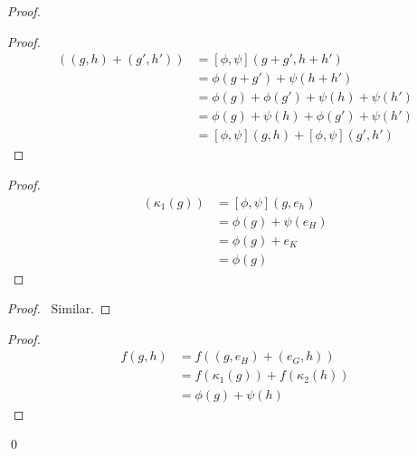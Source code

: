 \begin{proof}
    \pf
    \begin{proof}
        \pf
        \begin{align*}
            [\phi,\psi]((g,h) + (g',h')) & = [\phi,\psi](g + g', h + h')             \\
                                         & = \phi(g + g') + \psi(h + h')             \\
                                         & = \phi(g) + \phi(g') + \psi(h) + \psi(h') \\
                                         & = \phi(g) + \psi(h) + \phi(g') + \psi(h') \\
                                         & = [\phi,\psi](g,h) + [\phi,\psi](g',h')
        \end{align*}
    \end{proof}
    \begin{proof}
        \pf
        \begin{align*}
            [\phi,\psi](\kappa_1(g)) & = [\phi,\psi](g,e_h)  \\
                                     & = \phi(g) + \psi(e_H) \\
                                     & = \phi(g) + e_K       \\
                                     & = \phi(g)
        \end{align*}
    \end{proof}
    \begin{proof}
        \pf\ Similar.
    \end{proof}
    \begin{proof}
        \pf
        \begin{align*}
            f(g,h) & = f((g,e_H) + (e_G,h))            \\
                   & = f(\kappa_1(g)) + f(\kappa_2(h)) \\
                   & = \phi(g) + \psi(h)
        \end{align*}
    \end{proof}
    \qed
\end{proof}

